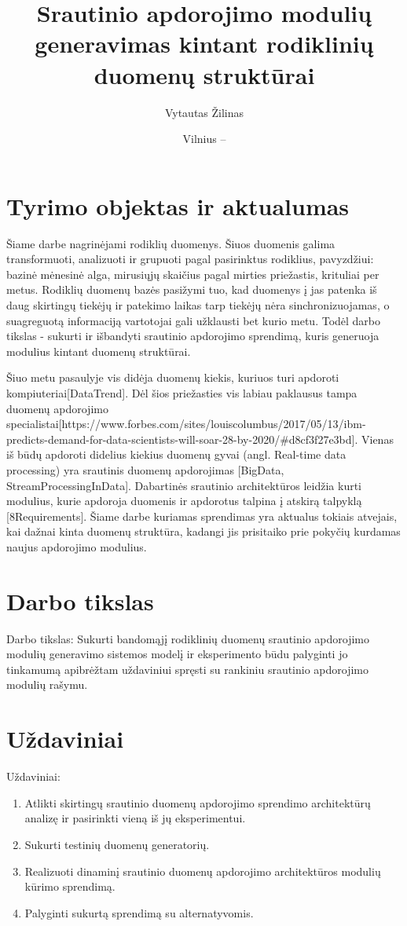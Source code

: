 \documentclass{VUMIFPSbakalaurinis}
\title{Srautinio apdorojimo modulių generavimas kintant rodiklinių duomenų struktūrai}
\author{Vytautas Žilinas}
\date{Vilnius – \the\year}
\begin{document}
 
\maketitle

\cleardoublepage{}
\setcounter{page}{2}

\section{Tyrimo objektas ir aktualumas}
Šiame darbe nagrinėjami rodiklių duomenys. Šiuos duomenis galima transformuoti, analizuoti ir grupuoti pagal pasirinktus rodiklius, pavyzdžiui: bazinė mėnesinė alga, mirusiųjų skaičius pagal mirties priežastis, krituliai per metus. 
Rodiklių duomenų bazės pasižymi tuo, kad duomenys į jas patenka iš daug skirtingų tiekėjų ir patekimo laikas tarp tiekėjų nėra sinchronizuojamas, o suagreguotą informaciją vartotojai gali užklausti bet kurio metu. Todėl darbo tikslas - sukurti ir išbandyti srautinio apdorojimo sprendimą, kuris generuoja modulius kintant duomenų struktūrai. \par
Šiuo metu pasaulyje vis didėja duomenų kiekis, kuriuos turi apdoroti kompiuteriai[DataTrend]. Dėl šios priežasties vis labiau paklausus tampa duomenų apdorojimo specialistai[https://www.forbes.com/sites/louiscolumbus/2017/05/13/ibm-predicts-demand-for-data-scientists-will-soar-28-by-2020/#d8cf3f27e3bd]. Vienas iš būdų apdoroti didelius kiekius duomenų gyvai (angl. Real-time data processing) yra srautinis duomenų apdorojimas [BigData, StreamProcessingInData]. Dabartinės srautinio architektūros leidžia kurti modulius, kurie apdoroja duomenis ir apdorotus talpina į atskirą talpyklą [8Requirements]. Šiame darbe kuriamas sprendimas yra aktualus tokiais atvejais, kai dažnai kinta duomenų struktūra, kadangi jis prisitaiko prie pokyčių kurdamas naujus apdorojimo modulius.

\section{Darbo tikslas}
Darbo tikslas: Sukurti bandomąjį rodiklinių duomenų srautinio apdorojimo modulių 
generavimo sistemos modelį ir eksperimento būdu palyginti jo tinkamumą apibrėžtam 
uždaviniui spręsti su rankiniu srautinio apdorojimo modulių rašymu.

\section{Uždaviniai}
Uždaviniai:
\begin{enumerate}
  \item Atlikti skirtingų srautinio duomenų apdorojimo sprendimo architektūrų analizę ir pasirinkti vieną iš jų eksperimentui.
  \item Sukurti testinių duomenų generatorių.
  \item Realizuoti dinaminį srautinio duomenų apdorojimo architektūros modulių kūrimo sprendimą.
	\item Palyginti sukurtą sprendimą su alternatyvomis.
\end{enumerate}
\end{document}
